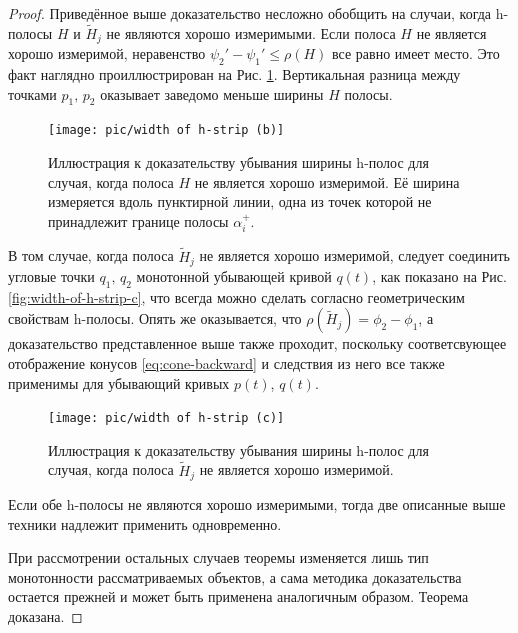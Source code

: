 \documentclass{article}
\begin{document}
\begin{proof}
Приведённое выше доказательство несложно обобщить на случаи, когда h-полосы $H$ и $\widetilde{H}_j$ не являются хорошо измеримыми.
Если полоса $H$ не является хорошо измеримой, неравенство $\psi_2' - \psi_1' \le \rho(H)$ все равно имеет место.
Это факт наглядно проиллюстрирован на Рис. \ref{fig:width-of-h-strip-b}.
Вертикальная разница между точками $p_1, \, p_2$ оказывает заведомо меньше ширины $H$ полосы.
\begin{figure}[h]
\centering
  \texttt{[image: pic/width of h-strip (b)]}
  \caption{Иллюстрация к доказательству убывания ширины h-полос для случая, когда полоса $H$ не является хорошо измеримой. Её ширина измеряется вдоль пунктирной линии, одна из точек которой не принадлежит границе полосы $\alpha_i^+$.}
\label{fig:width-of-h-strip-b}
\end{figure}
В том случае, когда полоса $\widetilde{H}_j$ не является хорошо измеримой, следует соединить угловые точки $q_1, \, q_2$ монотонной убывающей кривой $q(t)$, как показано на Рис. \ref{fig:width-of-h-strip-c}, что всегда можно сделать согласно геометрическим свойствам h-полосы.
Опять же оказывается, что $\rho(\widetilde{H}_j) = \phi_2 - \phi_1$, а доказательство представленное выше также проходит, поскольку соответсвующее отображение конусов \eqref{eq:cone-backward} и следствия из него все также применимы для убывающий кривых $p(t)$, $q(t)$.
\begin{figure}[h]
\centering
  \texttt{[image: pic/width of h-strip (c)]}
  \caption{Иллюстрация к доказательству убывания ширины h-полос для случая, когда полоса $\widetilde{H}_j$ не является хорошо измеримой.}
\label{fig:width-of-h-strip-с}
\end{figure}
Если обе h-полосы не являются хорошо измеримыми, тогда две описанные выше техники надлежит применить одновременно.

При рассмотрении остальных случаев теоремы изменяется лишь тип монотонности рассматриваемых объектов, а сама методика доказательства остается прежней и может быть применена аналогичным образом.
Теорема доказана.
\end{proof}

\pagebreak
\end{document}
